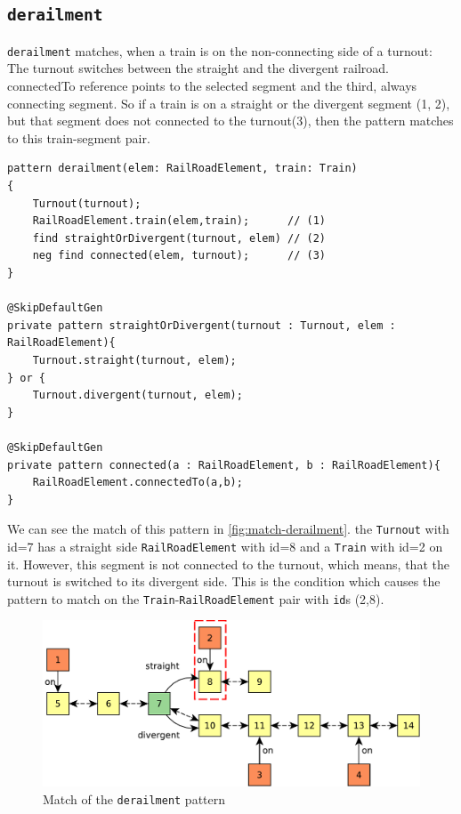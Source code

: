 \subsection{\texttt{derailment}}
\begin{minipage}{\textwidth}
	
\texttt{derailment} matches, when a train is on the non-connecting side of a turnout:
The turnout switches between the straight and the divergent railroad. 
connectedTo reference points to the selected segment and the third, always connecting segment.
So if a train is on a straight or the divergent segment (1, 2), but that segment does not connected to the turnout(3), then the pattern matches to this train-segment pair.


\begin{lstlisting}[language = vql]
pattern derailment(elem: RailRoadElement, train: Train)
{
	Turnout(turnout);
	RailRoadElement.train(elem,train); 		// (1)
	find straightOrDivergent(turnout, elem) // (2)
	neg find connected(elem, turnout); 		// (3)
}

@SkipDefaultGen
private pattern straightOrDivergent(turnout : Turnout, elem : RailRoadElement){
	Turnout.straight(turnout, elem);
} or {
	Turnout.divergent(turnout, elem);
}

@SkipDefaultGen
private pattern connected(a : RailRoadElement, b : RailRoadElement){
	RailRoadElement.connectedTo(a,b);
}

\end{lstlisting}
\end{minipage}

We can see the match of this pattern in \autoref{fig:match-derailment}. 
the \texttt{Turnout} with id=7 has a straight side \texttt{RailRoadElement} with id=8 and a \texttt{Train} with id=2 on it. However, this segment is not connected to the turnout, which means, that the turnout is switched to its divergent side.
This is the condition which causes the pattern to match on the \texttt{Train}-\texttt{RailRoadElement} pair with \texttt{id}s (2,8).

\begin{figure}[H]
	\begin{center}
		\includegraphics[width=\textwidth]{figures/query-example-model-derailment.pdf}
	\end{center}
	\caption{Match of the \texttt{derailment} pattern}
	\label{fig:match-derailment}
\end{figure}



